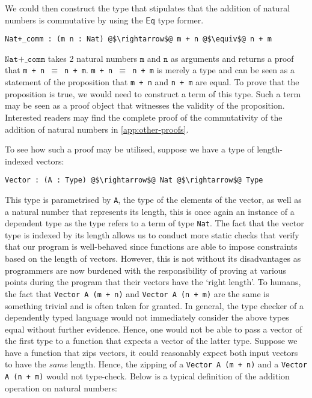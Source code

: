 \documentclass[12pt,twoside,maitrise]{dms}
\theoremstyle{definition}
\numberwithin{equation}{section}
\numberwithin{table}{chapter}
\numberwithin{figure}{chapter}
\newcommand\kw[1] {\textsf{#1}}
\newcommand\fn[1] {\texttt{#1}}
\begin{document}
We could then construct the type that stipulates that the addition of natural
numbers is commutative by using the $\kw{Eq}$ type former.

\begin{verbatim}
Nat+_comm : (m n : Nat) @$\rightarrow$@ m + n @$\equiv$@ n + m
\end{verbatim}

$\fn{Nat+\_comm}$ takes 2 natural numbers $\fn{m}$ and $\fn{n}$ as arguments and
returns a proof that \fn{m + n $\equiv$ n + m}. \fn{m + n $\equiv$ n + m} is
merely a type and can be seen as a statement of the proposition that \fn{m + n}
and \fn{n + m} are equal. To prove that the proposition is 
true, we would need to construct a term of this type. Such a term may be seen as
a proof object that witnesses the validity of the proposition. Interested
readers may find the complete proof of the commutativity of the addition of natural
numbers in \autoref{app:other-proofs}.

To see how such a proof may be utilised, suppose we have a type of
length-indexed vectors:

\begin{verbatim}
Vector : (A : Type) @$\rightarrow$@ Nat @$\rightarrow$@ Type
\end{verbatim}

This type is parametrised by \fn{A}, the type of the elements of the vector, as
well as a natural number that represents its length, this is once again an
instance of a dependent type as the type refers to a term of type \fn{Nat}. The
fact that the vector type is indexed by its length allows us to conduct more
static checks that verify that our program is well-behaved since functions are
able to impose constraints based on the length of vectors. However, this is not
without its disadvantages as programmers are now burdened with the
responsibility of proving at various points during the program that their
vectors have the `right length'. To humans, the fact that \fn{Vector A (m + n)}
and \fn{Vector A (n + m)} are the same is something trivial and is often taken
for granted. In general, the type checker of a dependently typed language would
not immediately consider the above types equal without further evidence. Hence,
one would not be able to pass a vector of the first type to a function that
expects a vector of the latter type. Suppose we have a function that zips
vectors, it could reasonably expect both input vectors to have the \emph{same}
length. Hence, the zipping of a \fn{Vector A (m + n)} and a \fn{Vector A (n +
  m)} would not type-check. Below is a typical definition of the addition
operation on natural numbers:
\end{document}
